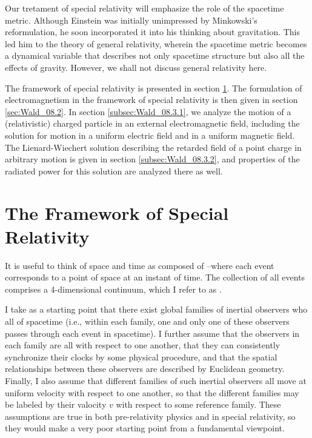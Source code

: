 Our tretament of special relativity will emphasize the role of the spacetime metric. Although Einstein was initially unimpressed by Minkowski's reformulation, he soon incorporated it into his thinking about gravitation. This led him to the theory of general relativity, wherein the spacetime metric becomes a dynamical variable that describes not only spacetime structure but also all the effects of gravity. However, we shall not discuss general relativity here. 

The framework of special relativity is presented in section \ref{sec:Wald_08.1}. The formulation of electromagnetism in the framework of special relativity is then given in section \ref{sec:Wald_08.2}. In section \ref{subsec:Wald_08.3.1}, we analyze the motion of a (relativistic) charged particle in an external electromagnetic field, including the solution for motion in a uniform electric field and in a uniform magnetic field. The Lienard-Wiechert solution describing the retarded field of a point charge in arbitrary motion is given in section \ref{subsec:Wald_08.3.2}, and properties of the radiated power for this solution are analyzed there as well.

\section{The Framework of Special Relativity}
\label{sec:Wald_08.1}
It is useful to think of space and time as composed of --where each event corresponds to a point of space at an instant of time. The collection of all events comprises a 4-dimensional continuum, which I refer to as . 

I take as a starting point that there exist global families of inertial observers who  all of spacetime (i.e., within each family, one and only one of these observers passes through each event in spacetime). I further assume that the observers in each family are all  with respect to one another, that they can consistently synchronize their clocks by some physical procedure, and that the spatial relationships between these observers are described by Euclidean geometry. Finally, I also assume that different families of such inertial observers all move at uniform velocity with respect to one another, so that the different families may be labeled by their valocity $v$ with respect to some reference family. These assumptions are true in both pre-relativity physics and in special relativity, so they would make a very poor starting point from a fundamental viewpoint. 

